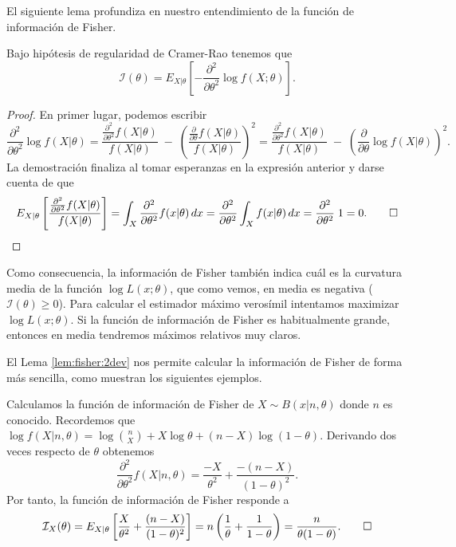 \documentclass{article}
\begin{document}
    El siguiente lema profundiza en nuestro entendimiento de la función de información de Fisher.

    \begin{lem} \label{lem:fisher:2dev}
        Bajo hipótesis de regularidad de Cramer-Rao tenemos que
        \[\mathcal{I}(\theta) = E_{X|\theta} \left[-\frac{\partial^2}{\partial\theta^2} \log f(X;\theta) \right].\]
    \end{lem}
    \begin{proof}
        En primer lugar, podemos escribir
        \[\frac{\partial^2}{\partial\theta^2} \log f(X|\theta)=\frac{\frac{\partial^2}{\partial\theta^2} f(X|\theta)}{f(X| \theta)}\;-\;\left( \frac{\frac{\partial}{\partial\theta} f(X|\theta)}{f(X| \theta)} \right)^2=\frac{\frac{\partial^2}{\partial\theta^2} f(X|\theta)}{f(X| \theta)}\;-\;\left( \frac{\partial}{\partial\theta} \log f(X|\theta)\right)^2.\]
        La demostración finaliza al tomar esperanzas en la expresión anterior y darse cuenta de que
        \[E_{X|\theta}\left[\frac{\frac{\partial^2}{\partial\theta^2} f(X|\theta)}{f(X| \theta)}\right] = \int_X \frac{\partial^2}{\partial\theta^2} f(x | \theta)\, dx = \frac{\partial^2}{\partial\theta^2} \int_X f(x | \theta)\, dx = \frac{\partial^2}{\partial\theta^2} \; 1 = 0. \qedhere\]
    \end{proof}

    Como consecuencia, la información de Fisher también indica cuál es la curvatura media de la función $\log L(x; \theta)$, que como vemos, en media es negativa ($\mathcal{I}(\theta) \ge 0$). Para calcular el estimador máximo verosímil intentamos maximizar $\log L(x; \theta)$. Si la función de información de Fisher es habitualmente grande, entonces en media tendremos máximos relativos muy claros.

    El Lema \ref{lem:fisher:2dev} nos permite calcular la información de Fisher de forma más sencilla, como muestran los siguientes ejemplos.

    \begin{ex} \label{ex:fisher:binom}
        Calculamos la función de información de Fisher de $X \sim B(x | n, \theta)$ donde $n$ es conocido. Recordemos que $\log f(X | n, \theta) = \log \binom{n}{X} + X \log \theta + (n - X) \log (1 - \theta)$. Derivando dos veces respecto de $\theta$ obtenemos
        \[\frac{\partial^2}{\partial \theta^2} f(X | n, \theta) = \frac{-X}{\theta^2} + \frac{-(n-X)}{(1 - \theta)^2}.\]
        Por tanto, la función de información de Fisher responde a
        \[\mathcal{I}_X(\theta) =  E_{X|\theta} \left[\frac{X}{\theta^2} + \frac{(n-X)}{(1 - \theta)^2}\right] = n \left(\frac{1}{\theta} + \frac{1}{1 - \theta}\right) = \frac{n}{\theta (1 - \theta)}. \qedhere\]
    \end{ex}
\end{document}
